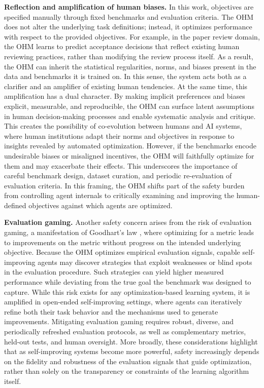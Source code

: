 \documentclass[]{fairmeta}
\begin{document}
\textbf{Reflection and amplification of human biases.}
In this work, objectives are specified manually through fixed benchmarks and evaluation criteria. The OHM does not alter the underlying task definitions; instead, it optimizes performance with respect to the provided objectives. For example, in the paper review domain, the OHM learns to predict acceptance decisions that reflect existing human reviewing practices, rather than modifying the review process itself. As a result, the OHM can inherit the statistical regularities, norms, and biases present in the data and benchmarks it is trained on. In this sense, the system acts both as a clarifier and an amplifier of existing human tendencies. At the same time, this amplification has a dual character. By making implicit preferences and biases explicit, measurable, and reproducible, the OHM can surface latent assumptions in human decision-making processes and enable systematic analysis and critique. This creates the possibility of co-evolution between humans and AI systems, where human institutions adapt their norms and objectives in response to insights revealed by automated optimization. However, if the benchmarks encode undesirable biases or misaligned incentives, the OHM will faithfully optimize for them and may exacerbate their effects. This underscores the importance of careful benchmark design, dataset curation, and periodic re-evaluation of evaluation criteria. In this framing, the OHM shifts part of the safety burden from controlling agent internals to critically examining and improving the human-defined objectives against which agents are optimized.

\textbf{Evaluation gaming.}
Another safety concern arises from the risk of evaluation gaming, a manifestation of Goodhart's law \citep{strathern1997improving}, where optimizing for a metric leads to improvements on the metric without progress on the intended underlying objective. Because the OHM optimizes empirical evaluation signals, capable self-improving agents may discover strategies that exploit weaknesses or blind spots in the evaluation procedure. Such strategies can yield higher measured performance while deviating from the true goal the benchmark was designed to capture. While this risk exists for any optimization-based learning system, it is amplified in open-ended self-improving settings, where agents can iteratively refine both their task behavior and the mechanisms used to generate improvements. Mitigating evaluation gaming requires robust, diverse, and periodically refreshed evaluation protocols, as well as complementary metrics, held-out tests, and human oversight. More broadly, these considerations highlight that as self-improving systems become more powerful, safety increasingly depends on the fidelity and robustness of the evaluation signals that guide optimization, rather than solely on the transparency or constraints of the learning algorithm itself.
\end{document}
